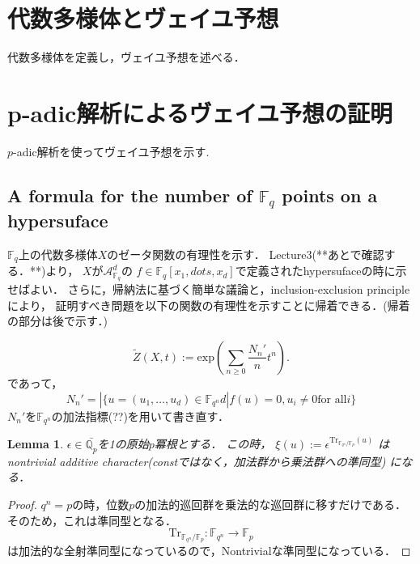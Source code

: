 \documentclass{ujarticle}
\newtheorem{lem}[thm]{Lemma}
\begin{document}
\section{代数多様体とヴェイユ予想}
\label{sec:代数多様体とヴェイユ予想}
代数多様体を定義し，ヴェイユ予想を述べる．

\section{p-adic解析によるヴェイユ予想の証明}
\label{sec:p-adicによるヴェイユ予想の証明}

$p$-adic解析を使ってヴェイユ予想を示す.
\subsection{A formula for the number of
$\mathbb{F}_q$ points on a hypersuface}
\label{sub:A formula for the number of F_q points on a hypersuface}

$\mathbb{F}_q$上の代数多様体$X$のゼータ関数の有理性を示す．
Lecture3(**あとで確認する．**)より，
$X$が$\mathcal{A}_{\mathbb{F}_q}^d$の
$f \in \mathbb{F}_  q[x_1,dots,x_d]$で定義されたhypersufaceの時に示せばよい．
さらに，帰納法に基づく簡単な議論と，inclusion-exclusion principleにより，
証明すべき問題を以下の関数の有理性を示すことに帰着できる．(帰着の部分は後で示す．)

\begin{equation*}
 \tilde{Z}(X,t):= \mathrm{exp}(\sum_{n \ge 0}\frac{N_n'}{n}t^n).
\end{equation*}
であって，
\begin{equation*}
 N_n'=|\{u= (u_1,\dots,u_d) \in \mathbb{F}_{q^n}d | f(u)=0,u_i \neq 0
 \mbox{for all}i\}
\end{equation*}
$N_n'$を$\mathbb{F}_{q^n}$の加法指標(??)を用いて書き直す．

\begin{lem}
 $ \epsilon \in  \bar{\mathbb{Q}_p}$を1の原始$p$冪根とする．
 この時，
 $\xi(u):=\epsilon^{\mathrm{Tr}_{\mathbb{F}_{q^n}/\mathbb{F}_p}(u)}$
 はnontrivial additive character(constではなく，加法群から乗法群への準同型)
 になる．
\end{lem}
\begin{proof}
$q^n=p$の時，位数$p$の加法的巡回群を乗法的な巡回群に移すだけである．
そのため，これは準同型となる．
\begin{equation*}
  \mathrm{Tr}_{\mathbb{F}_{q^n}/\mathbb{F}_p}:
  \mathbb{F}_{q^n} \to \mathbb{F}_p
\end{equation*}
は加法的な全射準同型になっているので，Nontrivialな準同型になっている．
\end{proof}
\end{document}
